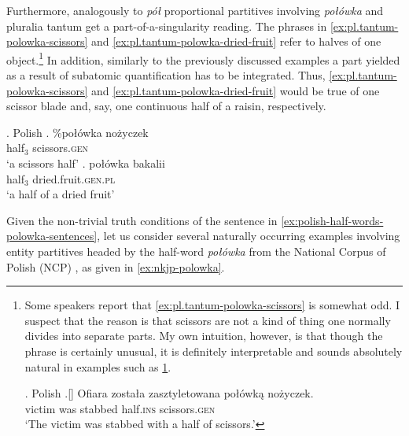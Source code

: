 Furthermore, analogously to \textit{pół} proportional partitives involving \textit{połówka} and pluralia tantum get a part-of-a-singularity reading. The phrases in \ref{ex:pl.tantum-polowka-scissors} and \ref{ex:pl.tantum-polowka-dried-fruit} refer to halves of one object.\footnote{Some speakers report that \ref{ex:pl.tantum-polowka-scissors} is somewhat odd. I suspect that the reason is that scissors are not a kind of thing one normally divides into separate parts. My own intuition, however, is that though the phrase is certainly unusual, it is definitely interpretable and sounds absolutely natural in examples such as \ref{ex:polish-polowka-scissors-stabbing}.

\ex. Polish
\bg.[] Ofiara została zasztyletowana połówką nożyczek.\\
victim was stabbed half\textsc{.ins} scissors\textsc{.gen}\\
`The victim was stabbed with a half of scissors.'\label{ex:polish-polowka-scissors-stabbing}

} In addition, similarly to the previously discussed examples a part yielded as a result of subatomic quantification has to be integrated. Thus, \ref{ex:pl.tantum-polowka-scissors} and \ref{ex:pl.tantum-polowka-dried-fruit} would be true of one scissor blade and, say, one continuous half of a raisin, respectively.\largerpage[2]

	\ex.\label{ex:pl.tantum-polowka} Polish
    \ag. \%połówka nożyczek\label{ex:pl.tantum-polowka-scissors}\\ 
	half$_3$ scissors\textsc{.gen}\\
	`a scissors half'
	\bg. połówka bakalii\label{ex:pl.tantum-polowka-dried-fruit}\\ 
	half$_3$ dried.fruit\textsc{.gen.pl}\\
	`a half of a dried fruit'

Given the non-trivial truth conditions of the sentence in \ref{ex:polish-half-words-polowka-sentences}, let us consider several naturally occurring examples involving entity partitives headed by the half-word \textit{połówka} from the National Corpus of Polish (NCP) \citep{przepiorkowski_et-al2012narodowy}, as given in \ref{ex:nkjp-polowka}.

